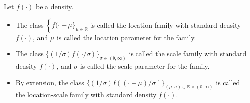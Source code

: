 \chapter{}

 Let \(f(\cdot)\) be a density. 
\begin{itemize}
    \item The class \(\left\{f(\cdot-\mu\}_{\mu \in \mathbb{R}}\right.\) is called the location family with standard density \(f(\cdot)\), and \(\mu\) is called the location parameter for the family. 
    \item The class \(\{(1 / \sigma) f(\cdot / \sigma)\}_{\sigma \in(0, \infty)}\) is called the scale family with standard density \(f(\cdot)\), and \(\sigma\) is called the scale parameter for the family. 
    \item By extension, the class \(\{(1 / \sigma) f((\cdot-\mu) / \sigma)\}_{(\mu, \sigma) \in \mathbb{R} \times(0, \infty)}\) is called the location-scale family with standard density \(f(\cdot)\).
\end{itemize}

